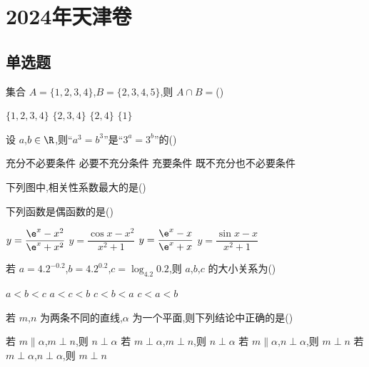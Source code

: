 \chapter{2024年天津卷}

\section{单选题}

\begin{problem}
集合 \(A=\{1,2,3,4\}\),\(B=\{2,3,4,5\}\),则 \(A\cap B=\)(\quad)

\choices
    {\(\{1,2,3,4\}\)}
    {\(\{2,3,4\}\)}
    {\(\{2,4\}\)}
    {\(\{1\}\)}
\end{problem}

\begin{problem}
设 \(a\),\(b\in \R\),则``\(a^3=b^3\)''是``\(3^a=3^b\)''的(\quad)

\choices
    {充分不必要条件}
    {必要不充分条件}
    {充要条件}
    {既不充分也不必要条件}
\end{problem}

\begin{problem}
下列图中,相关性系数最大的是(\quad)

\choices
    {}
    {}
    {}
    {}
\end{problem}

\begin{problem}
下列函数是偶函数的是(\quad)

\choices
    {\(y=\dfrac{\e^x-x^2}{\e^x+x^2}\)}
    {\(y=\dfrac{\cos x-x^2}{x^2+1}\)}
    {\(y=\dfrac{\e^x-x}{\e^x+x}\)}
    {\(y=\dfrac{\sin x-x}{x^2+1}\)}
\end{problem}

\begin{problem}
若 \(a=4.2^{-0.2}\),\(b=4.2^{0.2}\),\(c=\log_{4.2}0.2\),则 \(a\),\(b\),\(c\) 的大小关系为(\quad)

\choices
    {\(a<b<c\)}
    {\(a<c<b\)}
    {\(c<b<a\)}
    {\(c<a<b\)}
\end{problem}

\begin{problem}
若 \(m\),\(n\) 为两条不同的直线,\(\alpha\) 为一个平面,则下列结论中正确的是(\quad)

\choices
    {若 \(m\parallel \alpha\),\(m\perp n\),则 \(n\perp \alpha\)}
    {若 \(m\perp \alpha\),\(m\perp n\),则 \(n\perp \alpha\)}
    {若 \(m\parallel \alpha\),\(n\perp \alpha\),则 \(m\perp n\)}
    {若 \(m\perp \alpha\),\(n\perp \alpha\),则 \(m\perp n\)}
\end{problem}

